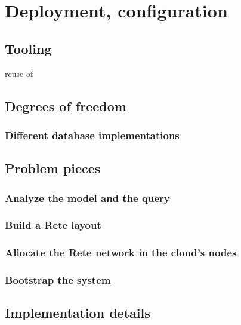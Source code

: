 \section{Deployment, configuration}
\label{sec:deployment-configuration}

\subsection{Tooling}

reuse of \eiq



\subsection{Degrees of freedom}

\subsubsection{Different database implementations}


\subsection{Problem pieces}

\subsubsection{Analyze the model and the query}

\subsubsection{Build a Rete layout}

\subsubsection{Allocate the Rete network in the cloud's nodes}

\subsubsection{Bootstrap the system}


\subsection{Implementation details}

